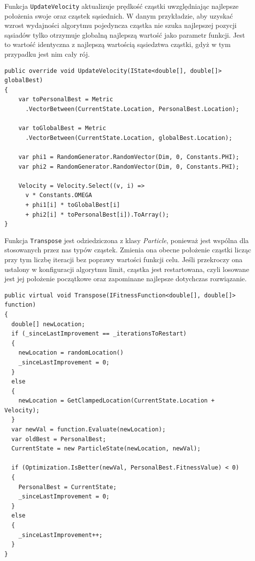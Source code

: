 \documentclass[12pt, twoside, openany, abstract=on]{report}
\theoremstyle{definition}
\begin{document}
Funkcja \texttt{UpdateVelocity} aktualizuje prędkość cząstki uwzględniając najlepsze położenia swoje oraz cząstek sąsiednich. W danym przykładzie, aby uzyskać wzrost wydajności algorytmu pojedyncza cząstka nie szuka najlepszej pozycji sąsiadów tylko otrzymuje globalną najlepszą wartość jako parametr funkcji. Jest to wartość identyczna z najlepszą wartością sąsiedztwa cząstki, gdyż w tym przypadku jest nim cały rój.

\lstset{style=sharpc}
\begin{lstlisting}[frame=single]
public override void UpdateVelocity(IState<double[], double[]> globalBest)
{
    var toPersonalBest = Metric
      .VectorBetween(CurrentState.Location, PersonalBest.Location);
            
    var toGlobalBest = Metric
      .VectorBetween(CurrentState.Location, globalBest.Location);

    var phi1 = RandomGenerator.RandomVector(Dim, 0, Constants.PHI);
    var phi2 = RandomGenerator.RandomVector(Dim, 0, Constants.PHI);

    Velocity = Velocity.Select((v, i) => 
      v * Constants.OMEGA 
      + phi1[i] * toGlobalBest[i] 
      + phi2[i] * toPersonalBest[i]).ToArray();
}

\end{lstlisting}

Funkcja \texttt{Transpose} jest odziedziczona z klasy \textit{Particle}, ponieważ jest wspólna dla stosowanych przez nas typów cząstek. Zmienia ona obecne położenie cząstki licząc przy tym liczbę iteracji bez poprawy wartości funkcji celu. Jeśli przekroczy ona ustalony w konfiguracji algorytmu limit, cząstka jest restartowana, czyli losowane jest jej położenie początkowe oraz zapominane najlepsze dotychczas rozwiązanie.

\lstset{style=sharpc}
\begin{lstlisting}[frame=single]
public virtual void Transpose(IFitnessFunction<double[], double[]> function)
{
  double[] newLocation;
  if (_sinceLastImprovement == _iterationsToRestart)
  {
    newLocation = randomLocation()
    _sinceLastImprovement = 0;
  }
  else
  {
    newLocation = GetClampedLocation(CurrentState.Location + Velocity);
  }
  var newVal = function.Evaluate(newLocation);
  var oldBest = PersonalBest;
  CurrentState = new ParticleState(newLocation, newVal);

  if (Optimization.IsBetter(newVal, PersonalBest.FitnessValue) < 0)
  {
    PersonalBest = CurrentState;
    _sinceLastImprovement = 0;
  }
  else
  {
    _sinceLastImprovement++;
  }
}
\end{lstlisting}
\end{document}

